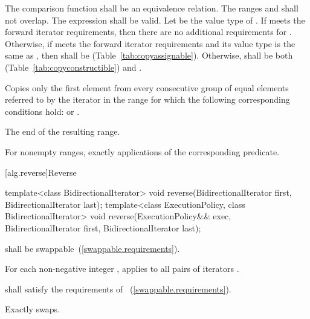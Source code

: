 \begin{itemdescr}
\pnum
\requires
The comparison function shall be an equivalence relation.
The ranges
and
shall not overlap. The expression
shall be valid.
Let  be the value type of .
If  meets the forward iterator requirements,
then there are no additional requirements for .
Otherwise, if  meets the forward iterator
requirements and its value type is the same as ,
then  shall be  (Table~\ref{tab:copyassignable}).
Otherwise,  shall be both
 (Table~\ref{tab:copyconstructible}) and
.

\pnum
\effects
Copies only the first element from every consecutive group of equal elements referred to by
the iterator
in the range
for which the following corresponding conditions hold:
or
.

\pnum
\returns
The end of the resulting range.

\pnum
\complexity
For nonempty ranges, exactly
applications of the corresponding predicate.
\end{itemdescr}

[alg.reverse]{Reverse}

%
\begin{itemdecl}
template<class BidirectionalIterator>
  void reverse(BidirectionalIterator first, BidirectionalIterator last);
template<class ExecutionPolicy, class BidirectionalIterator>
  void reverse(ExecutionPolicy&& exec,
               BidirectionalIterator first, BidirectionalIterator last);
\end{itemdecl}

\begin{itemdescr}
\pnum
\requires
{} shall be swappable~(\ref{swappable.requirements}).

\pnum
\effects
For each non-negative integer
,
applies
to all pairs of iterators
.

\pnum
\requires
{} shall satisfy the requirements of
~(\ref{swappable.requirements}).

\pnum
\complexity
Exactly
swaps.
\end{itemdescr}

